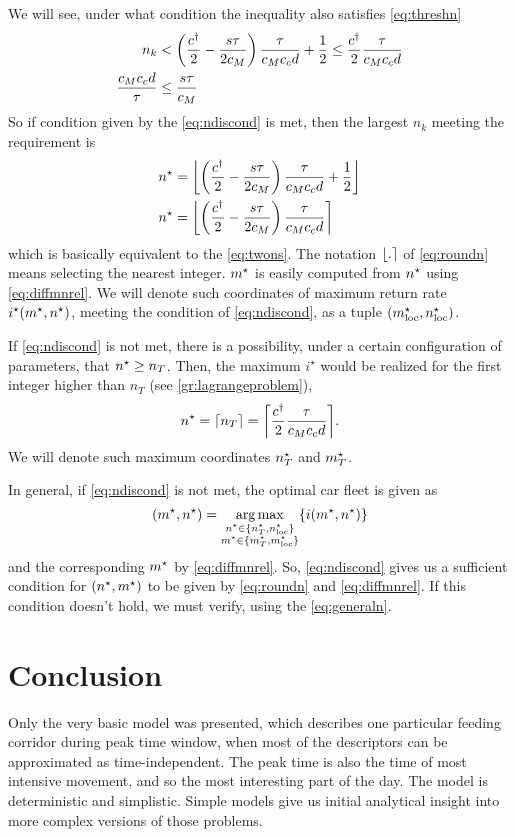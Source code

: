 \documentclass[a4paper]{report}
\DeclarePairedDelimiter\floor{\lfloor}{\rfloor}
\DeclarePairedDelimiter\ceil{\lceil}{\rceil}
\DeclarePairedDelimiter{\nint}{\lfloor}{\rceil}
\DeclareMathOperator*{\argmax}{arg\,max}
\begin{document}
We will see, under what condition the inequality also satisfies \autoref{eq:threshn}
\begin{align}
	n_k&<\left(\frac{c^{\dagger}}{2}-\frac{s\tau}{2c_M}\right)\frac{\tau}{c_Mc_c d}+\frac{1}{2} \leq  \frac{c^{\dagger}}{2} \frac{\tau}{c_Mc_cd} \nonumber\\
	\frac{c_Mc_cd}{\tau} &\leq \frac{s\tau}{c_M} \label{eq:ndiscond} 
\end{align}
So if condition given by the \autoref{eq:ndiscond} is met, then the largest $n_k$ meeting the requirement is
\begin{align}
	\ns&=\floor*{\left(\frac{\cd}{2}-\frac{s\tau}{2c_M}\right)\frac{\tau}{c_Mc_c d}+\frac{1}{2}}\nonumber\\
	\ns&=\nint*{\left(\frac{\cd}{2}-\frac{s\tau}{2c_M}\right)\frac{\tau}{c_Mc_c d}}\label{eq:roundn}
\end{align}
which is basically equivalent to the \autoref{eq:twons}. The notation $\nint*{.}$ of \autoref{eq:roundn} means selecting the nearest integer. $m^{\star}$ is easily computed from $n^\star$ using \autoref{eq:diffmnrel}. We will denote such coordinates of maximum return rate $i^\star(m^{\star}, n^\star)$, meeting the condition of \autoref{eq:ndiscond}, as a tuple $(m^{\star}_\text{loc},n^\star_\text{loc})$.

If \autoref{eq:ndiscond} is not met, there is a possibility, under a certain configuration of parameters, that $n^\star \geq n_T$. Then, the maximum $i^\star$ would be realized for the first integer higher than $n_T$ (see \autoref{gr:lagrangeproblem}), 
\begin{equation}
	\ns=\ceil*{n_T}=\ceil*{\frac{\cd}{2} \frac{\tau}{c_Mc_cd}}.	\label{eq:floornt}
\end{equation}
We will denote such maximum coordinates $n^\star_T$ and $m^{\star}_T$.

In general, if \autoref{eq:ndiscond} is not met, the optimal car fleet is given as
\begin{equation}
	(\ms,\ns)=\argmax\limits_{\substack{\ns\in\{\ns_T, \ns_\text{loc}\} \\ {\ms\in\{\ms_T, \ms_\text{loc}\}}}} \{i(\ms,\ns)\} \label{eq:generaln}
\end{equation}
and the corresponding $m^{\star}$ by  \autoref{eq:diffmnrel}. So, \autoref{eq:ndiscond} gives us a sufficient condition for $(n^\star,m^{\star})$ to be given by \autoref{eq:roundn} and \autoref{eq:diffmnrel}. If this condition doesn't hold, we must verify, using the \autoref{eq:generaln}.

\section{Conclusion}
Only the very basic model was presented, which describes one particular feeding corridor during peak time window, when most of the descriptors can be approximated as time-independent. The peak time is also the time of most intensive movement, and so the most interesting part of the day. The model is deterministic and simplistic. Simple models give us initial analytical insight into more complex versions of those problems.
\end{document}
